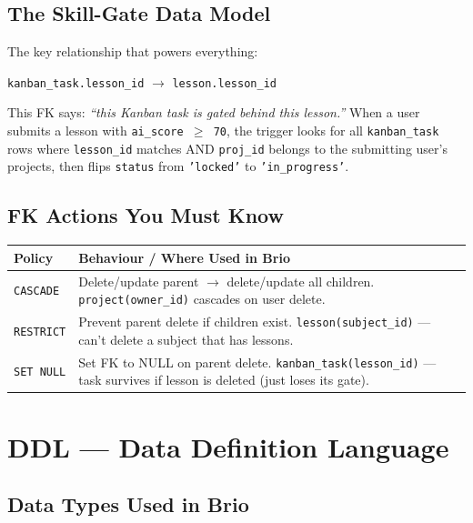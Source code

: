 \documentclass[11pt,a4paper]{article}
\newcommand{\T}[1]{\texttt{#1}}          %
\begin{document}
\subsection{The Skill-Gate Data Model}

The key relationship that powers everything:

\begin{center}
\T{kanban\_task.lesson\_id} $\to$ \T{lesson.lesson\_id}
\end{center}

This FK says: \textit{``this Kanban task is gated behind this lesson.''}
When a user submits a lesson with \T{ai\_score $\geq$ 70}, the trigger looks for all
\T{kanban\_task} rows where \T{lesson\_id} matches AND \T{proj\_id} belongs to the
submitting user's projects, then flips \T{status} from \T{'locked'} to
\T{'in\_progress'}.

\subsection{FK Actions You Must Know}

\begin{center}
\renewcommand{\arraystretch}{1.2}
\begin{tabular}{@{}p{2.8cm}p{9.5cm}@{}}
\toprule
\textbf{Policy} & \textbf{Behaviour / Where Used in Brio} \\
\midrule
\T{CASCADE}    & Delete/update parent $\to$ delete/update all children. \T{project(owner\_id)} cascades on user delete. \\
\T{RESTRICT}   & Prevent parent delete if children exist. \T{lesson(subject\_id)} — can't delete a subject that has lessons. \\
\T{SET NULL}   & Set FK to NULL on parent delete. \T{kanban\_task(lesson\_id)} — task survives if lesson is deleted (just loses its gate). \\
\bottomrule
\end{tabular}
\end{center}

\section{DDL --- Data Definition Language}

\subsection{Data Types Used in Brio}
\end{document}
